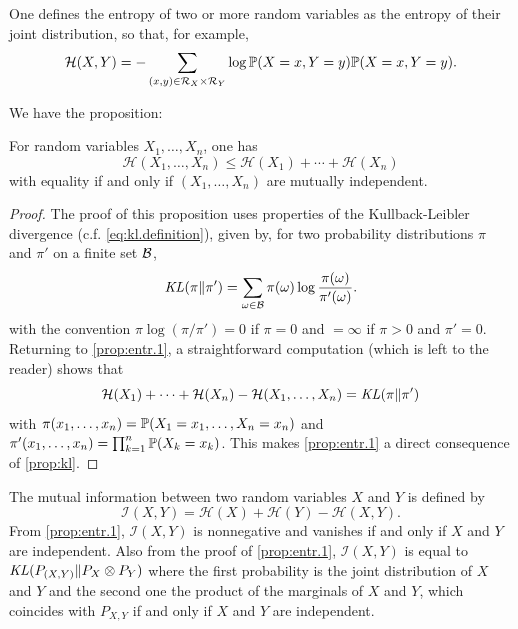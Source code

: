 One defines the entropy of two or more random variables as the entropy
of their joint distribution, so that, for example,
\[
\mathcal H(X,Y) = -\sum_{(x,y)\in {\mathcal R}_{X}\times {\mathcal R}_Y} \log \bm{\mathbb P}(X=x, Y=y) \bm{\mathbb P}(X=x, Y=y).
\]

We  have the proposition:
\begin{proposition}
\label{prop:entr.1} For random variables $X_1, \ldots, X_n$, one has
\[
\mathcal H(X_1, \ldots, X_n)\leq \mathcal H(X_1)+\cdots + \mathcal H(X_n)
\]
 with equality
if and only if 
$(X_1, \ldots, X_n)$ are mutually independent. 
\end{proposition}
\begin{proof}
The proof of this proposition uses  properties of the Kullback-Leibler divergence (c.f. \cref{eq:kl.definition}), given by, for two probability distributions
$\pi$ and $\pi'$ on a finite set ${\mathcal B}$,
$$
\mathit{KL}(\pi\|\pi') = \sum_{\omega\in {\mathcal B}} \pi(\omega) \log \frac{\pi(\omega)}{\pi'(\omega)}.
$$
with the convention $\pi\log(\pi/\pi') = 0$ if $\pi=0$ and $=\infty$ if $\pi>0$ and $\pi'=0$. 
Returning to  \cref{prop:entr.1}, a straightforward
computation (which is left to the reader) shows that 
\[
\mathcal H(X_1)+\cdots + \mathcal H(X_n) - \mathcal H(X_1, \ldots, X_n) = \mathit{KL}(\pi\|\pi')
\]
with $\pi(x_1, \ldots, x_n) = \bm{\mathbb P}(X_1=x_1, \ldots, X_n=x_n)$ and
$\pi'(x_1, \ldots, x_n) = \prod_{k=1}^n \bm{\mathbb P}(X_k=x_k)$. This makes
 \cref{prop:entr.1} a direct consequence of 
\cref{prop:kl}. 
\end{proof}

The mutual information between two random variables $X$ and $Y$ is
defined by
\begin{equation}
\label{eq:mut.inf}
\mathcal I(X,Y) = \mathcal H(X) + \mathcal H(Y) - \mathcal H(X,Y).
\end{equation}
From  \cref{prop:entr.1}, $\mathcal I(X,Y)$ is nonnegative and
vanishes if and only if $X$ and $Y$ are independent. Also from the
proof of  \cref{prop:entr.1}, $\mathcal I(X,Y)$ is equal to
$\mathit{KL}(P_{(X,Y)}\|P_X\otimes P_Y)$ where the first probability is the
joint distribution of $X$ and $Y$ and the second one the product of
the marginals of $X$ and $Y$, which coincides with $P_{X,Y}$ if and
only if $X$ and $Y$ are independent.

